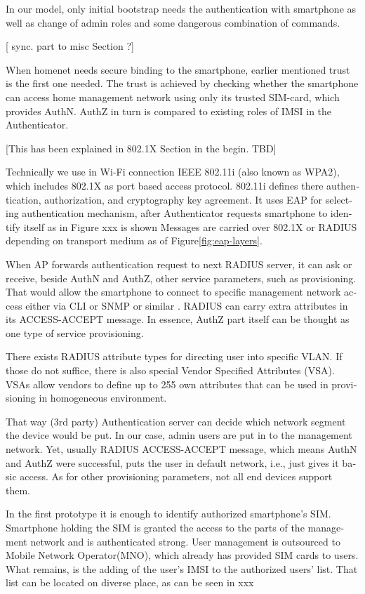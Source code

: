 \documentclass[12pt,a4paper,english]{tutthesis}
\begin{document}
\begin{otherlanguage}{english}
In our model, only initial bootstrap needs the authentication with
smartphone as well as change of admin roles and some dangerous
combination of commands.

[ sync. part to misc Section ?]





When homenet needs secure binding to the smartphone, earlier
mentioned trust is the first one needed.  The trust is achieved by
checking whether the smartphone can access home management
network using only its trusted SIM-card, which provides AuthN. AuthZ in
turn is compared to existing roles of IMSI in the Authenticator.


[This has been explained in 802.1X Section in the begin. TBD]

Technically we use in Wi-Fi connection IEEE 802.11i (also known as WPA2), which includes
802.1X as port based access protocol.  802.11i defines there
authentication, authorization, and cryptography key agreement.
 It uses EAP for selecting authentication 
mechanism, after Authenticator requests smartphone to identify itself as in Figure xxx is shown
Messages are carried over 802.1X or RADIUS depending on transport
medium as of Figure\ref{fig:eap-layers}.


When AP forwards authentication request to next RADIUS server, it can
ask or receive, beside AuthN and AuthZ, other service parameters, such
as provisioning. That would allow the smartphone to connect to
specific management network access either via CLI or SNMP or similar
 \cite[p.4]{rfc5608}.  RADIUS can carry extra attributes in its
ACCESS-ACCEPT message.   In essence, AuthZ part itself can be thought as
one type of service provisioning. 


There exists RADIUS attribute types for directing user into specific
VLAN. If those do not suffice, there is also special Vendor Specified
Attributes (VSA). VSAs allow vendors to define up to 255 own
attributes that can be used in provisioning in homogeneous environment. 


That way (3rd party) Authentication server can decide which network
segment the device would be put.  In our case, admin users are put in
to the management network.  Yet, usually RADIUS ACCESS-ACCEPT message,
which means AuthN and AuthZ were successful,  puts the user in
default network, i.e., just gives it basic access. As for other
provisioning parameters, not all end devices support them.

In the first prototype it is enough to identify authorized
smartphone's SIM.  Smartphone holding the SIM is granted the access to
the parts of the management network and is authenticated strong.  User
management is outsourced to Mobile Network Operator(MNO), which
already has provided SIM cards to users. What remains, is the adding
of the user's IMSI to the authorized users' list. That list can be
located on diverse place, as can be seen in xxx



\end{otherlanguage}
\end{document}
